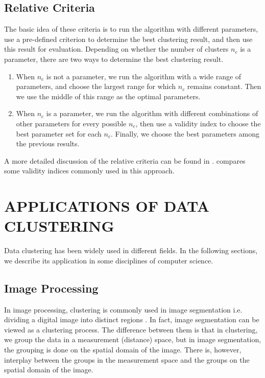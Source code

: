 \documentclass[conference]{IEEEtran}
\begin{document}
\subsection{Relative Criteria}
The basic idea of these criteria is to run the algorithm with different parameters, use a pre-defined criterion to determine the best clustering result, and then use this result for evaluation. Depending on whether the number of clusters $n_c$ is a parameter, there are two ways to determine the best clustering result.

\begin{enumerate}
\item When $n_c$ is not a parameter, we run the algorithm with a wide range of parameters, and choose the largest range for which $n_c$ remains constant. Then we use the middle of this range as the optimal parameters.
\item When $n_c$ is a parameter, we run the algorithm  with different combinations of other parameters for every possible $n_c$, then use a validity index to choose the best parameter set for each $n_c$. Finally, we choose the best parameters among the previous results.
\end{enumerate}

A more detailed discussion of the relative criteria can be found in \cite{Halkidi:2002:CVC:601858.601862}. \cite{bezdek1998some} compares some validity indices commonly used in this approach.

\section{APPLICATIONS OF DATA CLUSTERING} \label{sec:application}
Data clustering has been widely used in different fields. In the following sections, we describe its application in some disciplines of computer science.

\subsection{Image Processing}
In image processing, clustering is commonly used in image segmentation i.e. dividing a digital image into distinct regions \cite{haralick1985image}. In fact, image segmentation can be viewed as a clustering process. The difference between them is that in clustering, we group the data in a measurement (distance) space, but in image segmentation, the grouping is done
on the spatial domain of the image. There is, however, interplay between the groups in the measurement space and the groups on the spatial domain of the image.
\end{document}
